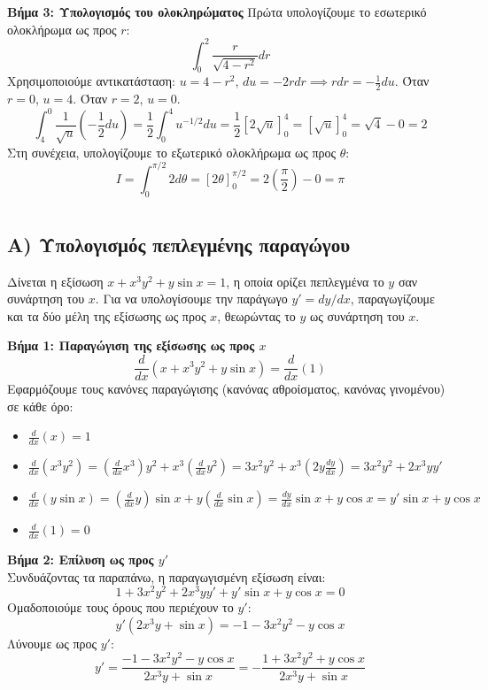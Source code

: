 \documentclass[a4paper,12pt,twoside]{article}
\newcommand{\kerkissans}[1]{{\fontfamily{maksf}\selectfont {#1}}}
\begin{document}
\noindent
\textbf{Βήμα 3: Υπολογισμός του ολοκληρώματος}
\noindent
Πρώτα υπολογίζουμε το εσωτερικό ολοκλήρωμα ως προς $r$:
\[ \int_0^2 \frac{r}{\sqrt{4 - r^2}} dr \]
Χρησιμοποιούμε αντικατάσταση: $u = 4 - r^2$, $du = -2r dr \implies r dr = -\frac{1}{2} du$.
Όταν $r=0$, $u=4$. Όταν $r=2$, $u=0$.
\[ \int_4^0 \frac{1}{\sqrt{u}} \left(-\frac{1}{2} du\right) = \frac{1}{2} \int_0^4 u^{-1/2} du = \frac{1}{2} [2\sqrt{u}]_0^4 = [\sqrt{u}]_0^4 = \sqrt{4} - 0 = 2 \]
Στη συνέχεια, υπολογίζουμε το εξωτερικό ολοκλήρωμα ως προς $\theta$:
\[ I = \int_0^{\pi/2} 2 d\theta = [2\theta]_0^{\pi/2} = 2\left(\frac{\pi}{2}\right) - 0 = \pi \]

\section*{\kerkissans{ΘΕΜΑ 4: Πεπλεγμένη Παραγώγιση και Κανόνας Αλυσίδας}}

\subsection*{A) Υπολογισμός πεπλεγμένης παραγώγου}
\noindent
Δίνεται η εξίσωση $x + x^3 y^2 + y \sin x = 1$, η οποία ορίζει πεπλεγμένα το $y$ σαν συνάρτηση του $x$. Για να υπολογίσουμε την παράγωγο $y' = dy/dx$, παραγωγίζουμε και τα δύο μέλη της εξίσωσης ως προς $x$, θεωρώντας το $y$ ως συνάρτηση του $x$.

\noindent
\textbf{Βήμα 1: Παραγώγιση της εξίσωσης ως προς $x$}
\[
\frac{d}{dx}(x + x^3 y^2 + y \sin x) = \frac{d}{dx}(1)
\]
Εφαρμόζουμε τους κανόνες παραγώγισης (κανόνας αθροίσματος, κανόνας γινομένου) σε κάθε όρο:
\begin{itemize}
    \item $\frac{d}{dx}(x) = 1$
    \item $\frac{d}{dx}(x^3 y^2) = (\frac{d}{dx}x^3)y^2 + x^3(\frac{d}{dx}y^2) = 3x^2 y^2 + x^3(2y \frac{dy}{dx}) = 3x^2 y^2 + 2x^3 y y'$
    \item $\frac{d}{dx}(y \sin x) = (\frac{d}{dx}y)\sin x + y(\frac{d}{dx}\sin x) = \frac{dy}{dx}\sin x + y \cos x = y' \sin x + y \cos x$
    \item $\frac{d}{dx}(1) = 0$
\end{itemize}

\noindent
\textbf{Βήμα 2: Επίλυση ως προς $y'$}\\
\noindent
Συνδυάζοντας τα παραπάνω, η παραγωγισμένη εξίσωση είναι:
\[
1 + 3x^2 y^2 + 2x^3 y y' + y' \sin x + y \cos x = 0
\]
Ομαδοποιούμε τους όρους που περιέχουν το $y'$:
\[
y'(2x^3 y + \sin x) = -1 - 3x^2 y^2 - y \cos x
\]
Λύνουμε ως προς $y'$:
\[
y' = \frac{-1 - 3x^2 y^2 - y \cos x}{2x^3 y + \sin x} = - \frac{1 + 3x^2 y^2 + y \cos x}{2x^3 y + \sin x}
\]
\end{document}
